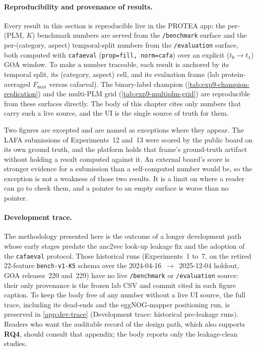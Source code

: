 \paragraph{Reproducibility and provenance of results.}
Every result in this section is reproducible live in the PROTEA app: the
per-(PLM, $K$) benchmark numbers are served from the \texttt{/benchmark} surface
and the per-(category, aspect) temporal-split numbers from the
\texttt{/evaluation} surface, both computed with \texttt{cafaeval}
(\texttt{prop=fill, norm=cafa}) over an explicit ($t_0 \to t_1$) GOA window. To
make a number traceable, each result is anchored by its temporal split, its
(category, aspect) cell, and its evaluation frame (lab protein-averaged
$F_{\max}$ versus cafaeval). The binary-label champion
(\cref{tab:exp9-champion-replication}) and the multi-PLM grid
(\cref{tab:exp9-multiplm-grid}) are reproducible from these surfaces directly.
The body of this chapter cites only numbers that carry such a live source, and
the UI is the single source of truth for them.

Two figures are excepted and are named as exceptions where they appear. The LAFA
submissions of Experiments~12 and~13 were scored by the public board on its own
ground truth, and the platform holds that frame's ground-truth artifact without
holding a result computed against it. An external board's score is stronger
evidence for a submission than a self-computed number would be, so the exception
is not a weakness of those two results. It is a limit on where a reader can go to
check them, and a pointer to an empty surface is worse than no pointer.

\paragraph{Development trace.}
The methodology presented here is the outcome of a longer development path whose
early stages predate the anc2vec look-up leakage fix and the adoption of the
\texttt{cafaeval} protocol. Those historical runs (Experiments~1 to~7, on the
retired 22-feature \texttt{bench-v1-K5} schema over the 2024-04-16~$\to$~2025-12-04
holdout, GOA releases~220 and~229) have no live \texttt{/benchmark} or
\texttt{/evaluation} source: their
only provenance is the frozen lab CSV and commit cited in each figure caption.
To keep the body free of any number without a live UI source, the full trace,
including its dead-ends and the eggNOG-mapper positioning run, is preserved in
\cref{app:dev-trace} (Development trace: historical pre-leakage runs). Readers
who want the auditable record of the design path, which also supports
\textbf{RQ4}, should consult that appendix; the body reports only the
leakage-clean studies.

